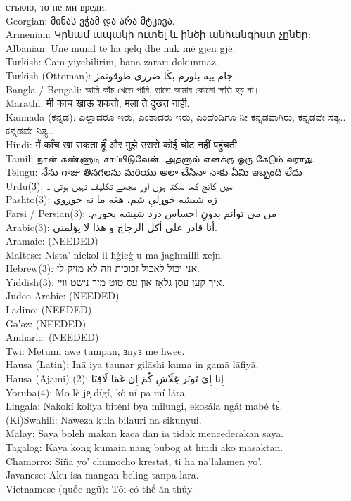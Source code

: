 \documentclass{report}
\begin{document}
стъкло, то не ми вреди.\\{} Georgian: მინას ვჭამ და არა მტკივა.\\{} Armenian: Կրնամ ապակի ուտել և ինծի անհանգիստ չըներ։\\{} Albanian: Unë mund të ha qelq dhe nuk më gjen gjë.\\{} Turkish: Cam yiyebilirim, bana zararı dokunmaz.\\{} Turkish (Ottoman): جام ييه بلورم بڭا ضررى طوقونمز\\{} Bangla / Bengali: আমি কাঁচ খেতে পারি, তাতে আমার কোনো ক্ষতি হয় না।\\{} Marathi: मी काच खाऊ शकतो, मला ते दुखत नाही.\\{} Kannada (ಕನ್ನಡ): ಎಲ್ಲಾದರೂ ಇರು, ಎಂತಾದರು ಇರು, ಎಂದೆಂದಿಗೂ ನೀ ಕನ್ನಡವಾಗಿರು, ಕನ್ನಡವೇ ಸತ್ಯ.. ಕನ್ನಡವೇ ನಿತ್ಯ..\\{} Hindi: मैं काँच खा सकता हूँ और मुझे उससे कोई चोट नहीं पहुंचती.\\{} Tamil: நான் கண்ணாடி சாப்பிடுவேன், அதனால் எனக்கு ஒரு கேடும் வராது.\\{} Telugu: నేను గాజు తినగలను మరియు అలా చేసినా నాకు ఏమి ఇబ్బంది లేదు\\{} Urdu(3): میں کانچ کھا سکتا ہوں اور مجھے تکلیف نہیں ہوتی ۔\\{} Pashto(3): زه شيشه خوړلې شم، هغه ما نه خوږوي\\{} Farsi / Persian(3): .من می توانم بدونِ احساس درد شيشه بخورم\\{} Arabic(3): أنا قادر على أكل الزجاج و هذا لا يؤلمني.\\{} Aramaic: (NEEDED)\\{} Maltese: Nista' niekol il{-}ħġieġ u ma jagħmilli xejn.\\{} Hebrew(3): אני יכול לאכול זכוכית וזה לא מזיק לי.\\{} Yiddish(3): איך קען עסן גלאָז און עס טוט מיר נישט װײ.\\{} Judeo{-}Arabic: (NEEDED)\\{} Ladino: (NEEDED)\\{} Gǝʼǝz: (NEEDED)\\{} Amharic: (NEEDED)\\{} Twi: Metumi awe tumpan, ɜnyɜ me hwee.\\{} Hausa (Latin): Inā iya taunar gilāshi kuma in gamā lāfiyā.\\{} Hausa (Ajami) (2): إِنا إِىَ تَونَر غِلَاشِ كُمَ إِن غَمَا لَافِىَا\\{} Yoruba(4): Mo lè je̩ dígí, kò ní pa mí lára.\\{} Lingala: Nakokí kolíya biténi bya milungi, ekosála ngáí mabé tɛ́.\\{} (Ki)Swahili: Naweza kula bilauri na sikunyui.\\{} Malay: Saya boleh makan kaca dan ia tidak mencederakan saya.\\{} Tagalog: Kaya kong kumain nang bubog at hindi ako masaktan.\\{} Chamorro: Siña yo' chumocho krestat, ti ha na'lalamen yo'.\\{} Javanese: Aku isa mangan beling tanpa lara.\\{} Vietnamese (quốc ngữ): Tôi có thể ăn thủy 
\end{document}
